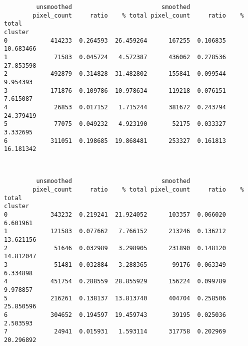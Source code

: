\documentclass[11pt]{article}
\begin{document}
    
    \begin{verbatim}
         unsmoothed                         smoothed                     
        pixel_count     ratio    % total pixel_count     ratio    % total
cluster                                                                  
0            414233  0.264593  26.459264      167255  0.106835  10.683466
1             71583  0.045724   4.572387      436062  0.278536  27.853598
2            492879  0.314828  31.482802      155841  0.099544   9.954393
3            171876  0.109786  10.978634      119218  0.076151   7.615087
4             26853  0.017152   1.715244      381672  0.243794  24.379419
5             77075  0.049232   4.923190       52175  0.033327   3.332695
6            311051  0.198685  19.868481      253327  0.161813  16.181342
    \end{verbatim}

    
    \begin{center}
    \end{center}
    { \hspace*{\fill} \\}
    
    
    \begin{verbatim}
         unsmoothed                         smoothed                     
        pixel_count     ratio    % total pixel_count     ratio    % total
cluster                                                                  
0            343232  0.219241  21.924052      103357  0.066020   6.601961
1            121583  0.077662   7.766152      213246  0.136212  13.621156
2             51646  0.032989   3.298905      231890  0.148120  14.812047
3             51481  0.032884   3.288365       99176  0.063349   6.334898
4            451754  0.288559  28.855929      156224  0.099789   9.978857
5            216261  0.138137  13.813740      404704  0.258506  25.850596
6            304652  0.194597  19.459743       39195  0.025036   2.503593
7             24941  0.015931   1.593114      317758  0.202969  20.296892
    \end{verbatim}

    
    \begin{center}
    \end{center}
    { \hspace*{\fill} \\}
    
\end{document}
